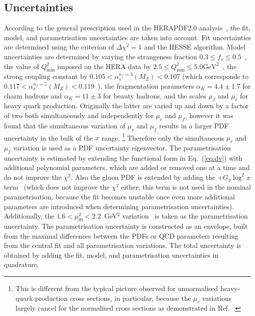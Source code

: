 \documentclass[12pt]{article}
\begin{document}
\subsection{Uncertainties}
\label{sec:pdfparam}

According to the general prescription used in the HERAPDF2.0 analysis~\cite{Abramowicz:2015mha}, 
the fit, model, and parametrisation uncertainties are taken into account.
Fit uncertainties are determined using the criterion of $\Delta\chi^2 = 1$ and the HESSE algorithm.
Model uncertainties are determined by varying the strangeness fraction $0.3 \leq f_{s} \leq 0.5$~\cite{Abramowicz:2015mha}, the value of $Q^2_{\text{min}}$ imposed on the HERA data by $2.5 \leq Q^2_\textrm{min}\leq 5.0\textrm{GeV}^2$~\cite{Abramowicz:2015mha}, the strong coupling constant by $0.105 < \alpha_s^{n_f=3}(M_Z) < 0.107$ (which corresponds to $0.117 < \alpha_s^{n_f=5}(M_Z) < 0.119$~\cite{Tanabashi:2018oca}), the fragmentation parameters $\alpha_K = 4.4 \pm 1.7$ for charm hadrons and $\alpha_K = 11 \pm 3$ for beauty hadrons, and the scales $\mu_f$ and $\mu_r$ for heavy quark production.
Originally the latter are varied up and down by a factor of two both simultaneously and independently for $\mu_r$ and $\mu_f$, however it was found that the simultaneous variation of $\mu_r$ and $\mu_f$ results in a larger PDF uncertainty in the bulk of the $x$ range.%
\footnote{This is different from the typical picture observed for unnormalised heavy-quark production cross sections, in particular, because the $\mu_r$ variations largely cancel for the normalised cross sections as demonstrated in Ref.~\cite{Zenaiev:2015rfa}.}
Therefore only the simultaneous $\mu_r$ and $\mu_f$ variation is used as a PDF uncertainty eigenvector.
The parametrisation uncertainty is estimated by extending the functional form in Eq.~(\ref{eq:dv}) with additional polynomial parameters, which are added or removed one at a time and do not improve the $\chi^2$. 
Also the gluon PDF is extended by adding the $+G_g\log^2 x$ term~\cite{Bonvini:2019wxf} (which does not improve the $\chi^2$ either; this term is not used in the nominal parametrisation, because the fit becomes unstable once even more additional parameters are introduced when determining parametrisation uncertainties).
Additionally, the $1.6 < \mu_\mathrm{f0}^2 < 2.2$~GeV$^2$ variation~\cite{Abramowicz:2015mha} is taken as the parametrisation uncertainty.
The parametrisation uncertainty is constructed as an envelope, built from the maximal differences between the PDFs or QCD parameters resulting from the central fit and all parametrisation variations.
The total uncertainty is obtained by adding the fit, model, and parametrisation uncertainties in quadrature.
\end{document}

